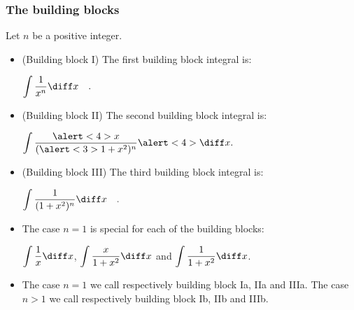 \begin{frame}
\frametitle{The building blocks}
Let $n$ be a positive integer.
\begin{itemize}
\item (Building block I) The first building block integral is:  

$\displaystyle \int \frac{1}{x^n }\diff x\quad .$
\item<2-> (Building block II) The second building block integral is: 

$\displaystyle \int \frac{\alert<4>{x}}{(\alert<3>{1+x^2})^n }\alert<4>{\diff x}.$ 
\item<5-> (Building block III) The third building block integral is: 

$\displaystyle \int \frac{1}{(1+x^2)^n }\diff x\quad .$
\item<6-> The case $n=1$ is special for each of the building blocks: 

$\displaystyle \int \frac{1}{x}\diff x$, $\displaystyle \int \frac{x}{1+x^2 }\diff x$ and $\displaystyle \int \frac{1}{1+x^2 }\diff x$.
\item<7-> The case $n=1$ we call respectively building block Ia, IIa and IIIa. 
 {The case $n>1$ we call respectively building block Ib, IIb and IIIb.} 
\end{itemize}

\end{frame}
